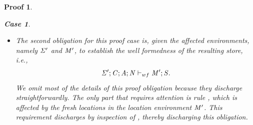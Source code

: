 \documentclass[showabstract,showacknowledgments,showpreface,showdedication]{iuphd}
\newtheorem*{bcase}{Case}
\theoremstyle{nonumberplain}
\newtheorem{nproof}{Proof}
\begin{document}
\begin{nproof}
\begin{bcase}
\begin{itemize}
    to show that, for each such $i$, $(\locreg{\overharpoon{\loc_i}}{\reg} \mapsto \overharpoon{\TYP_i}) \in \SENV'$,
    which is immediate by inspection on $\SENV'$ above.
    Third, and finally, to establish the typing judgement for $\EXPR'$, we use the Substitution
    Lemma \ref{lemma:substitution}, which yields
    \begin{align*}
    \emptyset;\SENV';\CENV;\AENV;\NENV \vdash \AENV;\NENV; \subst{\EXPR}{\overharpoon{\var_1}}{\concreteloc{\reg}{\overharpoon{w_1}}{\overharpoon{\locreg{\loc_1}{\reg}}}}
    \ldots \subst{}{\overharpoon{\var_n}}{\concreteloc{\reg}{\overharpoon{w_1}}{\overharpoon{\locreg{\loc_n}{\reg}}}}: \hTYP,
    \end{align*}
    as needed, thereby discharging this obligation.
    \item The second obligation
    for this proof case is, given the affected environments, namely
    $\SENV'$ and $\mathit{M}'$, to establish the well formedness
    of the resulting store, i.e.,
    \begin{displaymath}
    \mathit{\Sigma}';\mathit{C};\mathit{A};\mathit{N} \vdash_{wf} \mathit{M}';\mathit{S}.
    \end{displaymath}
    We omit most of the details of this proof obligation because they 
    discharge straightforwardly.
    The only part that requires attention is rule
    ,
    which is affected by the fresh locations in the location
    environment $\mathit{M}'$.
    This requirement discharges by inspection of \dcase{}, thereby
    discharging this obligation.
    \end{itemize}
  \end{bcase}


\end{nproof}
\end{document}
